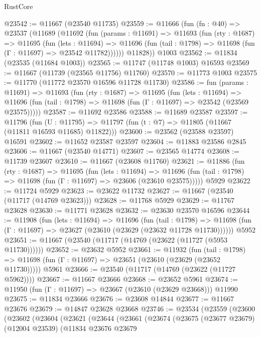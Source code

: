 \begin{lexlean}{RustCore}
\begin{coremodule}
@23542 := @11667 (@23540 @11735)
@23559 := @11666
    (fun (fn : @40) =>
    @23537
      (@11689
        (@11692
          (fun (params : @11691) =>
          @11693
            (fun (rty : @1687) =>
            @11695
              (fun (lets : @11694) =>
              @11696 (fun (tail : @1798) => @11698 (fun (Γ : @11697) => @23542 @11782))))))
        @11828))
    @1003
@23562 := @11834 (@23535 (@11684 @1003))
@23565 := @11747 (@11748 @1003) @16593
@23569 := @11667 (@11739 (@23565 @11756) @11760)
@23570 := @11773 @1003
@23575 := @11770 (@11772 @23570 @16596 @11728 @11730)
@23586 := fun (params : @11691) =>
  @11693
    (fun (rty : @1687) =>
    @11695
      (fun (lets : @11694) =>
      @11696 (fun (tail : @1798) => @11698 (fun (Γ : @11697) => @23542 (@23569 @23575)))))
@23587 := @11692 @23586
@23588 := @11689 @23587
@23597 := @11796
    (fun (U : @11795) => @11797 (fun (t : @7) => @11805 (@11667 (@11811 @16593 @11685) @11822)))
@23600 := @23562 (@23588 @23597) @16591
@23602 := @11652 @23587 @23597
@23604 := @11883 @23586 @2845
@23606 := @11667 (@23540 @14771)
@23607 := @23565 @14774
@23608 := @11739 @23607
@23610 := @11667 (@23608 @11760)
@23621 := @11886
    (fun (rty : @1687) =>
    @11695
      (fun (lets : @11694) =>
      @11696 (fun (tail : @1798) => @11698 (fun (Γ : @11697) => @23606 (@23610 @23575)))))
    @5929
@23622 := @11724 @5929
@23623 := @23622 @11732
@23627 := @11667 (@23540 (@11717 (@14769 @23623)))
@23628 := @11768 @5929
@23629 := @11767 @23628
@23630 := @11771 @23628
@23632 := @23630 @23570 @16596
@23644 := @11908
    (fun (lets : @11694) =>
    @11696
      (fun (tail : @1798) =>
      @11698 (fun (Γ : @11697) => @23627 (@23610 (@23629 (@23632 @11728 @11730))))))
    @5952
@23651 := @11667 (@23540 (@11717 (@14769 (@23622 (@11727 (@5953 @11730))))))
@23652 := @23632 @5952
@23661 := @11932
    (fun (tail : @1798) => @11698 (fun (Γ : @11697) => @23651 (@23610 (@23629 (@23652 @11730)))))
    @5961
@23666 := @23540 (@11717 (@14769 (@23622 (@11727 @5962))))
@23667 := @11667 @23666
@23668 := @23652 @5961
@23674 := @11950 (fun (Γ : @11697) => @23667 (@23610 (@23629 @23668))) @11990
@23675 := @11834 @23666
@23676 := @23608 @14844
@23677 := @11667 @23676
@23679 := @14847 @23628 @23668
@23746 := @23534
    (@23559
      (@23600
        (@23602
          (@23604
            (@23621
              (@23644
                (@23661
                  (@23674
                    (@23675
                      (@23677 @23679)
                      (@12004 @23539)
                      (@11834
                        @23676
                        @23679

\end{coremodule}
\end{lexlean}
